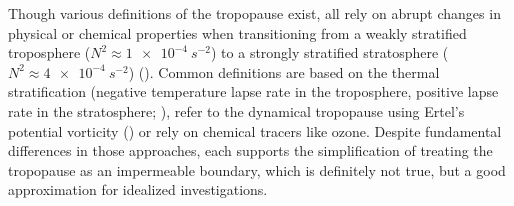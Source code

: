 Though various definitions of the tropopause exist, all rely on abrupt changes in physical or chemical properties when transitioning from a weakly stratified troposphere ($N^2 \approx \SI{1e-4}{s^{-2}}$) to a strongly stratified stratosphere ($N^2 \approx \SI{4e-4}{s^{-2}}$) (\cite{birner_fine-scale_2006}). Common definitions are based on the thermal stratification (negative temperature lapse rate in the troposphere, positive  lapse rate in the stratosphere; \cite{wmo_meteorology_1957}), refer to the dynamical tropopause using Ertel's potential vorticity (\cite{wmo_atmospheric_1985}) or rely on chemical tracers like ozone. Despite fundamental differences in those approaches, each supports the simplification of treating the tropopause as an impermeable boundary, which is definitely not true, but a good approximation for idealized investigations. 

